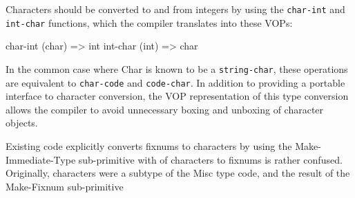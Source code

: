 Characters should be converted to and from integers by using the \clisp
{\tt char-int} and {\tt int-char} functions, which the compiler translates into
these VOPs:
\begin{example}
char-int (char) => int
int-char (int) => char
\end{example}
In the common case where Char is known to be a {\tt string-char}, these
operations are equivalent to {\tt char-code} and {\tt code-char}.  In addition to
providing a portable interface to character conversion, the VOP representation
of this type conversion allows the compiler to avoid unnecessary boxing and
unboxing of character objects.

Existing code explicitly converts fixnums to characters by using the
Make-Immediate-Type sub-primitive with %
of characters to fixnums is rather confused.  Originally, characters were a
subtype of the Misc type code, and the result of the Make-Fixnum sub-primitive
